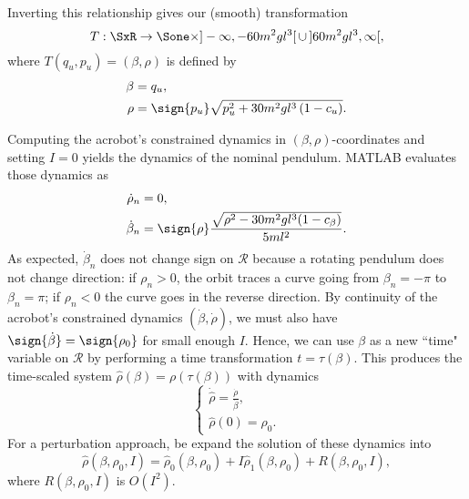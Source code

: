 Inverting this relationship gives our (smooth) transformation
\begin{equation*}
    T : \SxR \rightarrow 
    \Sone \times ]-\infty,-60m^2gl^3[\, \cup \, ]60m^2gl^3,\infty[ 
    ,
\end{equation*}
where \(T(q_u,p_u) = (\beta,\rho)\) is defined by
\begin{align}\label{eqn:rotation-T}
    \beta &= q_u
    , \\
    \rho &= \sign{p_u}\sqrt{p_u^2 + 30 m^2 g l^3 \left(1 - c_u \right)}
    .
\end{align}

Computing the acrobot's constrained dynamics in \((\beta,\rho)\)-coordinates and
setting \(I = 0\) yields the dynamics of the nominal pendulum.
MATLAB evaluates those dynamics as
\begin{align}\label{eqn:acrobot-rot-mu-dot-nom}
    \dot{\rho}_n &= 0
    , \\
    \label{eqn:acrobot-rot-alpha-dot-nom}
    \dot{\beta}_n &=  \sign{\rho} 
    \frac{\sqrt{\rho^2 - 30m^2gl^3(1 - c_\beta)}}{5ml^2}
    .
\end{align}
As expected, \(\dot{\beta}_n\) does not change sign on \(\mathcal{R}\) because
a rotating pendulum does not change direction:
if \(\rho_n > 0\), the orbit traces a curve going from \(\beta_n = -\pi\) to 
\(\beta_n = \pi\); if \(\rho_n < 0\) the curve goes in the reverse direction.
By continuity of the acrobot's constrained dynamics 
\((\dot{\beta},\dot{\rho})\), we must also have 
\(\sign{\dot{\beta}} = \sign{\rho_0}\) for small enough \(I\).
Hence, we can use \(\beta\) as a new ``time" variable on \(\mathcal{R}\) 
by performing a time transformation \(t = \tau(\beta)\).
This produces the time-scaled system \(\hat{\rho}(\beta) = \rho(\tau(\beta))\)
with dynamics
\[
    \begin{cases}
        \dot{\hat{\rho}} = \frac{\dot{\rho}}{\dot{\beta}}
        , \\
        \hat{\rho}(0) = \rho_0
        .
    \end{cases}
\]
For a perturbation approach, be expand the solution of these dynamics into
\begin{equation}\label{eqn:acrobot-rhohat-approx}
    \hat{\rho}(\beta,\rho_0,I) = \hat{\rho}_0(\beta,\rho_0) + I
    \hat{\rho}_1(\beta,\rho_0) + R(\beta,\rho_0,I)
    ,
\end{equation}
where \(R(\beta,\rho_0,I)\) is \(O(I^2)\).

